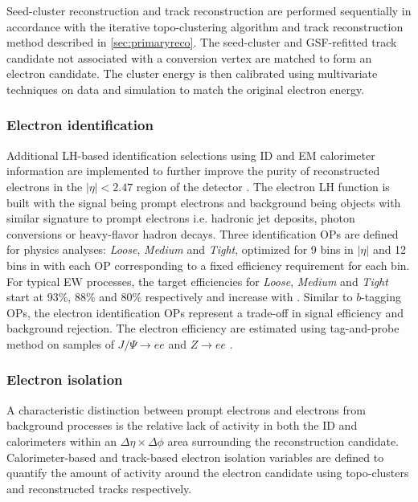\documentclass[../thesis.tex]{subfiles}
\begin{document}
Seed-cluster reconstruction and track reconstruction are performed sequentially in accordance with the iterative topo-clustering algorithm and track reconstruction method described in \autoref{sec:primaryreco}. The seed-cluster and \acs{GSF}-refitted track candidate not associated with a conversion vertex are matched to form an electron candidate. The cluster energy is then calibrated using multivariate techniques on data and simulation to match the original electron energy.

\subsubsection*{Electron identification}
Additional \acs{LH}-based identification selections using \acs{ID} and \acs{EM} calorimeter information are implemented to further improve the purity of reconstructed electrons in the $|\eta|<2.47$ region of the detector \citep{reco:electron_id}. The electron \acs{LH} function is built with the signal being prompt electrons and background being objects with similar signature to prompt electrons i.e. hadronic jet deposits, photon conversions or heavy-flavor hadron decays. Three identification \acs{OP}s are defined for physics analyses: \textit{Loose}, \textit{Medium} and \textit{Tight}, optimized for 9 bins in $|\eta|$ and 12 bins in \ET with each \acs{OP} corresponding to a fixed efficiency requirement for each bin. For typical \acs{EW} processes, the target efficiencies for \textit{Loose}, \textit{Medium} and \textit{Tight} start at 93\%, 88\% and 80\% respectively and increase with \ET. Similar to $b$-tagging \acs{OP}s, the electron identification {OP}s represent a trade-off in signal efficiency and background rejection. The electron efficiency are estimated using tag-and-probe method on samples of $J/\Psi \rightarrow ee$ and $Z \rightarrow ee$ \citep{reco:electron_id}.

\subsubsection*{Electron isolation}
\label{sec:eiso}
A characteristic distinction between prompt electrons and electrons from background processes is the relative lack of activity in both the \acs{ID} and calorimeters within an $\Delta \eta \times \Delta \phi$ area surrounding the reconstruction candidate. Calorimeter-based and track-based electron isolation variables \citep{reco:electron_id} are defined to quantify the amount of activity around the electron candidate using topo-clusters and reconstructed tracks respectively.
\end{document}
